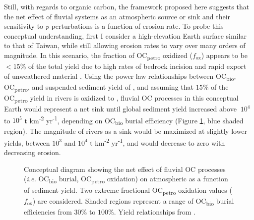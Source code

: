 Still, with regards to organic carbon, the framework proposed here suggests that the net effect of fluvial systems as an atmospheric  source or sink and their sensitivity to \textit{p} perturbations is a function of erosion rate. To probe this conceptual understanding, first I consider a high-elevation Earth surface similar to that of Taiwan, while still allowing erosion rates to vary over many orders of magnitude. In this scenario, the fraction of OC\textsubscript{petro} oxidized ($f_{\text{ox}}$) appears to be $<15$\% of the total yield due to high rates of bedrock incision and rapid export of unweathered material \citep{Hilton:2011jw}. Using the power law relationships between OC\textsubscript{bio}, OC\textsubscript{petro}, and suspended sediment yield of \citet{Galy:2015fx}, and assuming that $15$\% of the OC\textsubscript{petro} yield in rivers is oxidized to , fluvial OC processes in this conceptual Earth would represent a net  sink until global sediment yield increased above $~ 10^4$ to $10^5$ t km\textsuperscript{-2} yr\textsuperscript{-1}, depending on OC\textsubscript{bio} burial efficiency (Figure \ref{Ch7Fig:2}, blue shaded region). The magnitude of rivers as a  sink would be maximized at slightly lower yields, between $10^3$ and $10^4$ t km\textsuperscript{-2} yr\textsuperscript{-1}, and would decrease to zero with decreasing erosion.

\begin{figure}[h]
	\caption[Riverine OC  source/sink as a function of sediment yield]{Conceptual diagram showing the net effect of fluvial OC processes (\textit{i.e.} OC\textsubscript{bio} burial, OC\textsubscript{petro} oxidation) on atmospheric  as a function of sediment yield. Two extreme fractional OC\textsubscript{petro} oxidation values ($f_{\text{ox}}$) are considered. Shaded regions represent a range of OC\textsubscript{bio} burial efficiencies from $30$\% to $100$\%. Yield relationships from \citet{Galy:2015fx}.}
	\label{Ch7Fig:2}
\end{figure}

